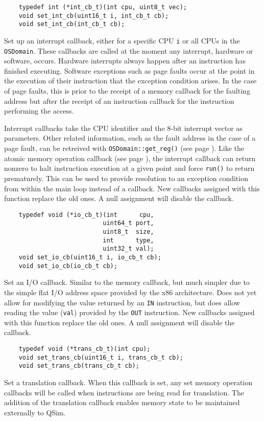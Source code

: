\documentclass[letterpaper, 10pt]{book}
\begin{document}
\label{func:set_int_cb} \begin{verbatim}
    typedef int (*int_cb_t)(int cpu, uint8_t vec);
    void set_int_cb(uint16_t i, int_cb_t cb);
    void set_int_cb(int_cb_t cb);
\end{verbatim}
Set up an interrupt callback, either for a specific CPU \texttt{i} or all CPUs
in the \texttt{OSDomain}. These callbacks are called at the moment any
interrupt, hardware or software, occurs. Hardware interrupts always happen
after an instruction has finished executing. Software exceptions such as page
faults occur at the point in the execution of their instruction that the
exception condition arises. In the case of page faults, this is prior to the
receipt of a memory callback for the faulting address but after the receipt of
an instruction callback for the instruction performing the access.

Interrupt callbacks take the CPU identifier and the 8-bit interrupt vector as
parameters. Other related information, such as the fault address in the case of
a page fault, can be retreived with \texttt{OSDomain::get\_reg()} (see page 
\pageref{func:get_reg}).  Like the atomic memory operation callback (see page 
\pageref{func:set_atomic_cb}), the interrupt callback can return nonzero to
halt instruction execution at a given point and force \texttt{run()} to return
prematurely. This can be used to provide resolution to an exception condition
from within the main loop instead of a callback. New callbacks
assigned with this function replace the old ones. A null assignment will
disable the callback.

\label{func:set_io_cb} \begin{verbatim}
    typedef void (*io_cb_t)(int      cpu, 
                           uint64_t port, 
                           uint8_t  size, 
                           int      type, 
                           uint32_t val);
    void set_io_cb(uint16_t i, io_cb_t cb);
    void set_io_cb(io_cb_t cb);
\end{verbatim}
Set an I/O callback. Similar to the memory callback, but much simpler due to
the simple flat I/O address space provided by the x86 architecture. Does not
yet allow for modifying the value returned by an \texttt{IN} instruction, but
does allow reading the value (\texttt{val}) provided by the \texttt{OUT}
instruction. New callbacks assigned with this function replace the old ones. A
null assignment will disable the callback.

\label{func:set_trans_cb} \begin{verbatim}
    typedef void (*trans_cb_t)(int cpu);
    void set_trans_cb(uint16_t i, trans_cb_t cb);
    void set_trans_cb(trans_cb_t cb);
\end{verbatim}
Set a translation callback. When this callback is set, any set memory operation
callbacks will be called when instructions are being read for translation. The
addition of the translation callback enables memory state to be maintained
externally to QSim.
\end{document}
